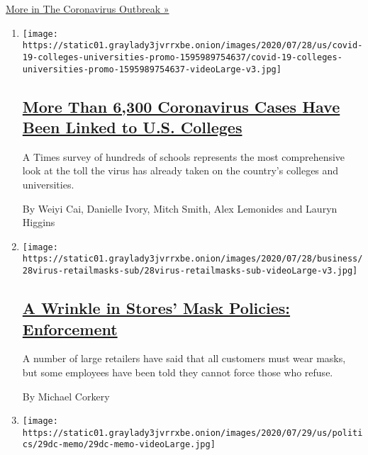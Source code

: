 \href{/news-event/coronavirus}{More in The Coronavirus Outbreak »}

\begin{enumerate}
\def\labelenumi{\arabic{enumi}.}
\item
  \texttt{[image: https://static01.graylady3jvrrxbe.onion/images/2020/07/28/us/covid-19-colleges-universities-promo-1595989754637/covid-19-colleges-universities-promo-1595989754637-videoLarge-v3.jpg]}

  \hypertarget{more-than-6300-coronavirus-cases-have-been-linked-to-us-colleges}{%
  \subsection{\texorpdfstring{\href{/interactive/2020/07/28/us/covid-19-colleges-universities.html}{More
  Than 6,300 Coronavirus Cases Have Been Linked to U.S.
  Colleges}}{More Than 6,300 Coronavirus Cases Have Been Linked to U.S. Colleges}}\label{more-than-6300-coronavirus-cases-have-been-linked-to-us-colleges}}

  A Times survey of hundreds of schools represents the most
  comprehensive look at the toll the virus has already taken on the
  country's colleges and universities.

  By Weiyi Cai, Danielle Ivory, Mitch Smith, Alex Lemonides and Lauryn
  Higgins
\item
  \texttt{[image: https://static01.graylady3jvrrxbe.onion/images/2020/07/28/business/28virus-retailmasks-sub/28virus-retailmasks-sub-videoLarge-v3.jpg]}

  \hypertarget{a-wrinkle-in-stores-mask-policies-enforcement}{%
  \subsection{\texorpdfstring{\href{/2020/07/29/business/coronavirus-masks-stores-walmart.html}{A
  Wrinkle in Stores' Mask Policies:
  Enforcement}}{A Wrinkle in Stores' Mask Policies: Enforcement}}\label{a-wrinkle-in-stores-mask-policies-enforcement}}

  A number of large retailers have said that all customers must wear
  masks, but some employees have been told they cannot force those who
  refuse.

  By Michael Corkery
\item
  \texttt{[image: https://static01.graylady3jvrrxbe.onion/images/2020/07/29/us/politics/29dc-memo/29dc-memo-videoLarge.jpg]}

  \hypertarget{divided-and-demoralized-on-virus-aid-republicans-ask-whats-in-the-bill}{%
}
\end{enumerate}
